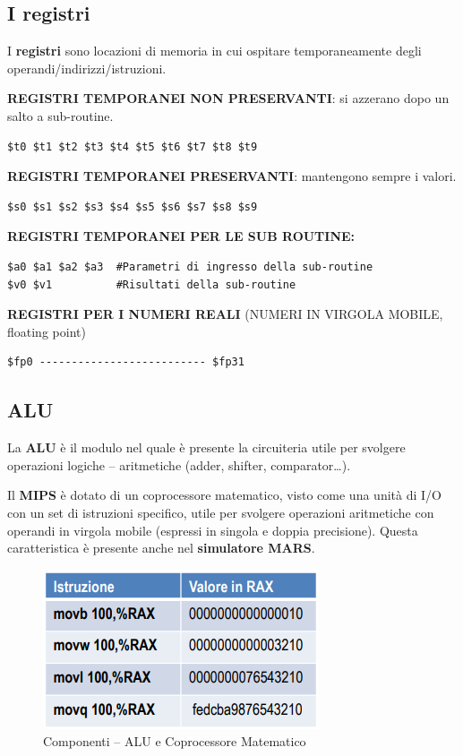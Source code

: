 \documentclass[12pt]{article} %
\begin{document}
\subsection{I registri}
I \textbf{registri} sono locazioni di memoria in cui ospitare temporaneamente degli operandi/indirizzi/istruzioni.\par\medskip\noindent
\textbf{REGISTRI TEMPORANEI NON PRESERVANTI}: si azzerano dopo un salto a sub-routine.
\begin{lstlisting}
$t0 $t1 $t2 $t3 $t4 $t5 $t6 $t7 $t8 $t9
\end{lstlisting}
\vspace{\baselineskip}
\textbf{REGISTRI TEMPORANEI PRESERVANTI}: mantengono sempre i valori.
\begin{lstlisting}
$s0 $s1 $s2 $s3 $s4 $s5 $s6 $s7 $s8 $s9
\end{lstlisting}
\newpage
\noindent \textbf{REGISTRI TEMPORANEI PER LE SUB ROUTINE:}
\begin{lstlisting}
$a0 $a1 $a2 $a3  #Parametri di ingresso della sub-routine
$v0 $v1          #Risultati della sub-routine
\end{lstlisting}
\vspace{\baselineskip}
\textbf{REGISTRI PER I NUMERI REALI} (NUMERI IN VIRGOLA MOBILE, floating point)
\begin{lstlisting}
$fp0 -------------------------- $fp31
\end{lstlisting}
\vspace{\baselineskip}
\subsection{ALU}
La \textbf{ALU} è il modulo nel quale è presente la circuiteria utile per svolgere operazioni logiche – aritmetiche (adder, shifter, comparator…).\par\medskip\noindent
Il \textbf{MIPS} è dotato di un coprocessore matematico, visto come una unità di I/O con un set di istruzioni specifico, utile per svolgere operazioni aritmetiche con operandi in virgola mobile (espressi in singola e doppia precisione). Questa caratteristica è presente anche nel \textbf{simulatore MARS}.\par\medskip\noindent
\begin{figure}[h]
\centering
\includegraphics[width=0.75\linewidth]{image.png}
\caption{Componenti – ALU e Coprocessore Matematico}
\label{fig:enter-label}
\end{figure}
\newpage
\end{document}

